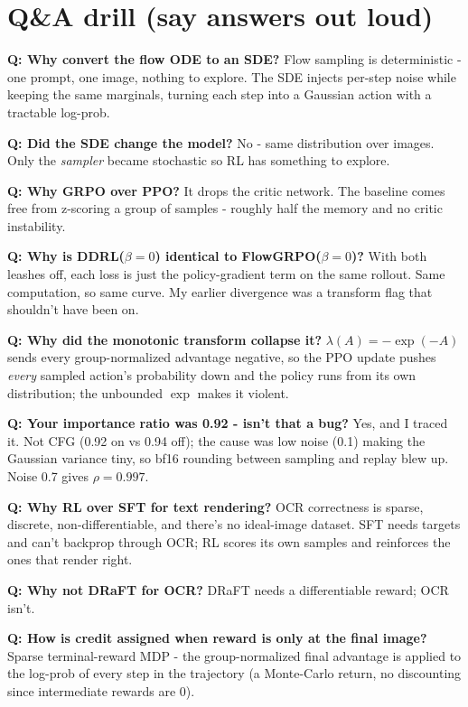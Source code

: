 \documentclass[11pt]{article}
\begin{document}
\section{Q\&A drill (say answers out loud)}

\textbf{Q: Why convert the flow ODE to an SDE?} Flow sampling is deterministic - one
prompt, one image, nothing to explore. The SDE injects per-step noise while keeping
the same marginals, turning each step into a Gaussian action with a tractable log-prob.

\textbf{Q: Did the SDE change the model?} No - same distribution over images. Only the
\textit{sampler} became stochastic so RL has something to explore.

\textbf{Q: Why GRPO over PPO?} It drops the critic network. The baseline comes free
from z-scoring a group of samples - roughly half the memory and no critic instability.

\textbf{Q: Why is DDRL($\beta{=}0$) identical to FlowGRPO($\beta{=}0$)?} With both
leashes off, each loss is just the policy-gradient term on the same rollout. Same
computation, so same curve. My earlier divergence was a transform flag that shouldn't
have been on.

\textbf{Q: Why did the monotonic transform collapse it?} $\lambda(A)=-\exp(-A)$ sends
every group-normalized advantage negative, so the PPO update pushes \textit{every}
sampled action's probability down and the policy runs from its own distribution; the
unbounded $\exp$ makes it violent.

\textbf{Q: Your importance ratio was 0.92 - isn't that a bug?} Yes, and I traced it.
Not CFG (0.92 on vs 0.94 off); the cause was low noise (0.1) making the Gaussian
variance tiny, so bf16 rounding between sampling and replay blew up. Noise 0.7 gives
$\rho=0.997$.

\textbf{Q: Why RL over SFT for text rendering?} OCR correctness is sparse, discrete,
non-differentiable, and there's no ideal-image dataset. SFT needs targets and can't
backprop through OCR; RL scores its own samples and reinforces the ones that render
right.

\textbf{Q: Why not DRaFT for OCR?} DRaFT needs a differentiable reward; OCR isn't.

\textbf{Q: How is credit assigned when reward is only at the final image?} Sparse
terminal-reward MDP - the group-normalized final advantage is applied to the log-prob
of every step in the trajectory (a Monte-Carlo return, no discounting since
intermediate rewards are 0).
\end{document}
